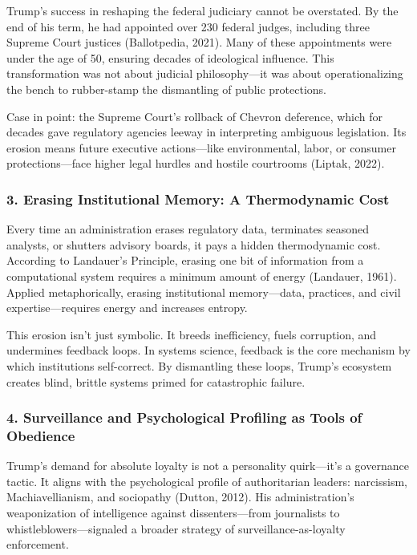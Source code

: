 Trump's success in reshaping the federal judiciary cannot be overstated.
By the end of his term, he had appointed over 230 federal judges,
including three Supreme Court justices (Ballotpedia, 2021). Many of
these appointments were under the age of 50, ensuring decades of
ideological influence. This transformation was not about judicial
philosophy---it was about operationalizing the bench to rubber-stamp the
dismantling of public protections.

Case in point: the Supreme Court's rollback of Chevron deference, which
for decades gave regulatory agencies leeway in interpreting ambiguous
legislation. Its erosion means future executive actions---like
environmental, labor, or consumer protections---face higher legal
hurdles and hostile courtrooms (Liptak, 2022).

\subsubsection{\texorpdfstring{3. \textbf{Erasing Institutional Memory:
A Thermodynamic
Cost}}{3. Erasing Institutional Memory: A Thermodynamic Cost}}\label{erasing-institutional-memory-a-thermodynamic-cost}

Every time an administration erases regulatory data, terminates seasoned
analysts, or shutters advisory boards, it pays a hidden thermodynamic
cost. According to Landauer's Principle, erasing one bit of information
from a computational system requires a minimum amount of energy
(Landauer, 1961). Applied metaphorically, erasing institutional
memory---data, practices, and civil expertise---requires energy and
increases entropy.

This erosion isn't just symbolic. It breeds inefficiency, fuels
corruption, and undermines feedback loops. In systems science, feedback
is the core mechanism by which institutions self-correct. By dismantling
these loops, Trump's ecosystem creates blind, brittle systems primed for
catastrophic failure.

\subsubsection{\texorpdfstring{4. \textbf{Surveillance and Psychological
Profiling as Tools of
Obedience}}{4. Surveillance and Psychological Profiling as Tools of Obedience}}\label{surveillance-and-psychological-profiling-as-tools-of-obedience}

Trump's demand for absolute loyalty is not a personality quirk---it's a
governance tactic. It aligns with the psychological profile of
authoritarian leaders: narcissism, Machiavellianism, and sociopathy
(Dutton, 2012). His administration's weaponization of intelligence
against dissenters---from journalists to whistleblowers---signaled a
broader strategy of surveillance-as-loyalty enforcement.

